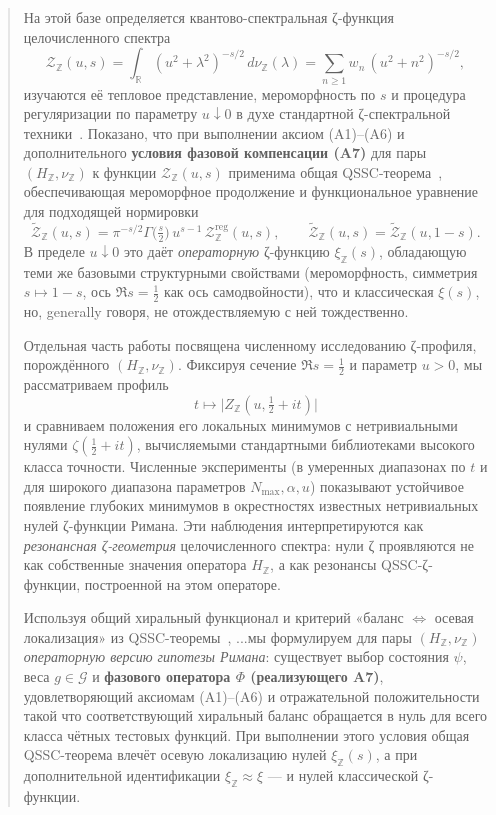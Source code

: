 \documentclass{article}
\numberwithin{equation}{section}
\theoremstyle{plain}
\theoremstyle{definition}
\theoremstyle{remark}
\def\alpha{α}\def\beta{β}\def\gamma{γ}\def\Gamma{Γ}%
\begin{document}
\begin{abstract}
На этой базе определяется квантово-спектральная ζ-функция целочисленного спектра
\begin{equation}
\label{eq:Z-Z-abstract}
\mathcal Z_{\mathbb Z}(u,s)
=\int_{\mathbb R}(u^2+\lambda^2)^{-s/2}\,d\nu_{\mathbb Z}(\lambda)
=\sum_{n\ge1}w_n\,(u^2+n^2)^{-s/2},
\end{equation}
изучаются её тепловое представление, мероморфность по $s$ и процедура регуляризации по параметру $u\downarrow0$ в духе стандартной ζ-спектральной техники~\cite{Seeley1967,BerlineGetzlerVergne1992,Elizalde1995}. 
Показано, что при выполнении аксиом (A1)–(A6) и дополнительного \textbf{условия фазовой компенсации (A7)} для пары $(H_{\mathbb Z},\nu_{\mathbb Z})$ к функции $\mathcal Z_{\mathbb Z}(u,s)$ применима общая QSSC-теорема~\cite{Monakhov-QSG-002}, обеспечивающая мероморфное продолжение и функциональное уравнение для подходящей нормировки\begin{equation}
\widetilde{\mathcal Z}_{\mathbb Z}(u,s)
=\pi^{-s/2}\Gamma\!\Big(\tfrac s2\Big)\,u^{s-1}\,\mathcal Z_{\mathbb Z}^{\mathrm{reg}}(u,s),
\qquad
\widetilde{\mathcal Z}_{\mathbb Z}(u,s)
=\widetilde{\mathcal Z}_{\mathbb Z}(u,1-s).
\end{equation}
В пределе $u\downarrow0$ это даёт \emph{операторную} ζ-функцию $\xi_{\mathbb Z}(s)$, обладающую теми же базовыми структурными свойствами (мероморфность, симметрия $s\mapsto1-s$, ось $\Re s=\tfrac12$ как ось самодвойности), что и классическая $\xi(s)$, но, generally говоря, не отождествляемую с ней тождест\-венно.

Отдельная часть работы посвящена численному исследованию ζ-профиля, порождённого $(H_{\mathbb Z},\nu_{\mathbb Z})$. 
Фиксируя сечение $\Re s=\tfrac12$ и параметр $u>0$, мы рассматриваем профиль
\begin{equation}
t\mapsto\bigl|Z_{\mathbb Z}(u,\tfrac12+it)\bigr|
\end{equation}
и сравниваем положения его локальных минимумов с нетривиальными нулями $\zeta(\tfrac12+it)$, вычисляемыми стандартными библиотеками высокого класса точности. 
Численные эксперименты (в умеренных диапазонах по $t$ и для широкого диапазона параметров $N_{\max},\alpha,u$) показывают устойчивое появление глубоких минимумов в окрестностях известных нетривиальных нулей ζ-функции Римана. 
Эти наблюдения интерпретируются как \emph{резонансная ζ-геометрия} целочисленного спектра: нули ζ проявляются не как собственные значения оператора $H_{\mathbb Z}$, а как резонансы QSSC-ζ-функции, построенной на этом операторе.

Используя общий хиральный функционал и критерий «баланс $\Longleftrightarrow$ осевая локализация» из QSSC-теоремы~\cite{Monakhov-QSG-002}, ...мы формулируем для пары $(H_{\mathbb Z},\nu_{\mathbb Z})$ \emph{операторную версию гипотезы Римана}: существует выбор состояния $\psi$, веса $g\in\mathcal G$ и \textbf{фазового оператора $\Phi$ (реализующего A7)}, удовлетворяющий аксиомам (A1)–(A6) и отражательной положительности такой что соответствующий хиральный баланс обращается в нуль для всего класса чётных тестовых функций. 
При выполнении этого условия общая QSSC-теорема влечёт осевую локализацию нулей $\xi_{\mathbb Z}(s)$, а при дополнительной идентификации $\xi_{\mathbb Z}\approx\xi$ — и нулей классической ζ-функции.


\end{abstract}
\end{document}
